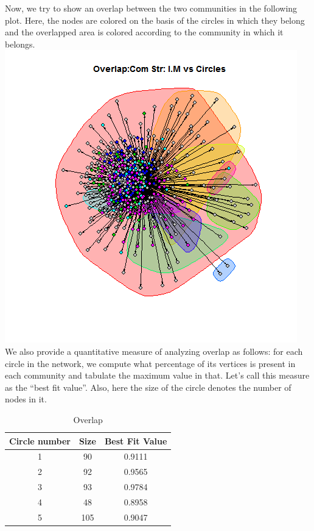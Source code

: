 \documentclass{article}
\begin{document}
\begin{enumerate}
 Now, we try to show an overlap between the two communities in the following plot.
Here, the nodes are colored on the basis of the circles in which they belong and 
the overlapped area is colored according to the community in which it belongs.\\
 \includegraphics[scale=0.7]{7_1e} \\
 
 We also provide a quantitative measure of analyzing overlap as follows: for each circle in the network,
 we compute what percentage of its vertices is present in each community and tabulate the maximum value in that.
 Let's call this measure as the ``best fit value''. Also, here the size of the circle denotes the number of nodes in it.
\begin{table}[ht]
\caption{Overlap}
\centering
\begin{tabular}{| c | c | c |}
\hline\hline
\newline

Circle number & Size & Best Fit Value \\ [0.5ex]
\hline

1 & 90 & 0.9111 \\
\hline
2 & 92 & 0.9565 \\
\hline
3 & 93 & 0.9784 \\
\hline
4 & 48 & 0.8958 \\
\hline
5 & 105 & 0.9047 \\
\hline
\end{tabular}
\end{table} 


\end{enumerate}
\end{document}
